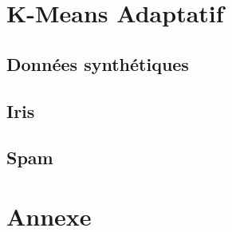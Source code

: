 \documentclass[a4paper, titlepage]{report}
\begin{document}
\chapter{K-Means Adaptatif}


\section{Données synthétiques}

\section{Iris}

\section{Spam}



\chapter*{Annexe}

\end{document}
